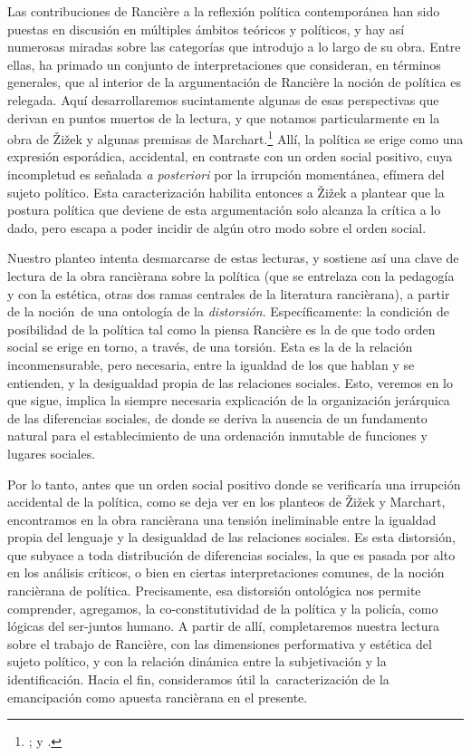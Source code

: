 Las contribuciones de Rancière a la reflexión política contemporánea han sido puestas en discusión en múltiples ámbitos teóricos y políticos, y hay así numerosas miradas sobre las categorías que introdujo a lo largo de su obra. Entre ellas, ha primado un conjunto de interpretaciones que consideran, en términos generales, que al interior de la argumentación de Rancière la noción de política es relegada. Aquí desarrollaremos sucintamente algunas de esas perspectivas que derivan en puntos muertos de la lectura, y que notamos particularmente en la obra de Žižek y algunas premisas de Marchart.\footnote{\cite[][]{@6998-MARCHART2009}; y \cite[][]{@7063-ZIZEK2005}.} Allí, la política se erige como una expresión esporádica, accidental, en contraste con un orden social positivo, cuya incompletud es señalada \emph{a posteriori} por la irrupción momentánea, efímera del sujeto político. Esta caracterización habilita entonces a Žižek a plantear que la postura política que deviene de esta argumentación solo alcanza la crítica a lo dado, pero escapa a poder incidir de algún otro modo sobre el orden social.

Nuestro planteo intenta desmarcarse de estas lecturas, y sostiene así una clave de lectura de la obra rancièrana sobre la política (que se entrelaza con la pedagogía y con la estética, otras dos ramas centrales de la literatura rancièrana), a partir de la noción~de una ontología de la \emph{distorsión}. Específicamente: la condición de posibilidad de la política tal como la piensa Rancière es la de que todo orden social se erige en torno, a través, de una torsión. Esta es la de la relación inconmensurable, pero necesaria, entre la igualdad de los que hablan y se entienden, y la desigualdad propia de las relaciones sociales. Esto, veremos en lo que sigue, implica la siempre necesaria explicación de la organización jerárquica de las diferencias sociales, de donde se deriva la ausencia de un fundamento natural para el establecimiento de una ordenación inmutable de funciones y lugares sociales.

Por lo tanto, antes que un orden social positivo donde se verificaría una irrupción accidental de la política, como se deja ver en los planteos de Žižek y Marchart, encontramos en la obra rancièrana una tensión ineliminable entre la igualdad propia del lenguaje y la desigualdad de las relaciones sociales. Es esta distorsión, que subyace a toda distribución de diferencias sociales, la que es pasada por alto en los análisis críticos, o bien en ciertas interpretaciones comunes, de la noción rancièrana de política. Precisamente, esa distorsión ontológica nos permite comprender, agregamos, la co-constitutividad de la política y la policía, como lógicas del ser-juntos humano. A partir de allí, completaremos nuestra lectura sobre el trabajo de Rancière, con las dimensiones performativa y estética del sujeto político, y con la relación dinámica entre la subjetivación y la identificación. Hacia el fin, consideramos útil la~caracterización de la emancipación como apuesta rancièrana en el presente.

